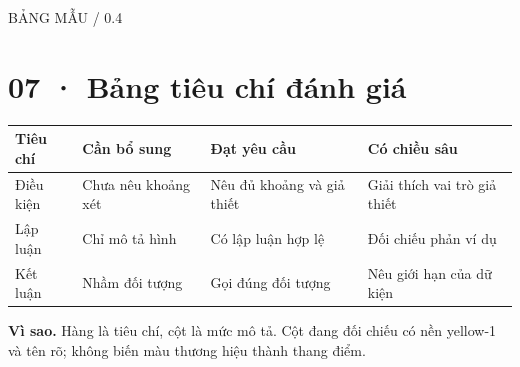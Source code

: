 \documentclass[11pt,a4paper]{article}
\newcommand{\tagline}[1]{{\small\color{muted}\MakeUppercase{#1}}\par}
\newcommand{\why}[1]{\par{\small\color{muted}\textbf{Vì sao.} #1}\par}
\begin{document}
\tagline{Bảng mẫu / 0.4}\section*{07 · Bảng tiêu chí đánh giá}
\begin{tabularx}{\linewidth}{|>{\raggedright\arraybackslash}X|>{\raggedright\arraybackslash}X|>{\raggedright\arraybackslash}X|>{\raggedright\arraybackslash}X|}\hline
\rowcolor{head}Tiêu chí & Cần bổ sung & Đạt yêu cầu & Có chiều sâu\\\hline
Điều kiện & Chưa nêu khoảng xét & Nêu đủ khoảng và giả thiết & Giải thích vai trò giả thiết\\\hline
Lập luận & Chỉ mô tả hình & Có lập luận hợp lệ & Đối chiếu phản ví dụ\\\hline
Kết luận & Nhầm đối tượng & Gọi đúng đối tượng & Nêu giới hạn của dữ kiện\\\hline
\end{tabularx}\why{Hàng là tiêu chí, cột là mức mô tả. Cột đang đối chiếu có nền yellow-1 và tên rõ; không biến màu thương hiệu thành thang điểm.}
\end{document}
